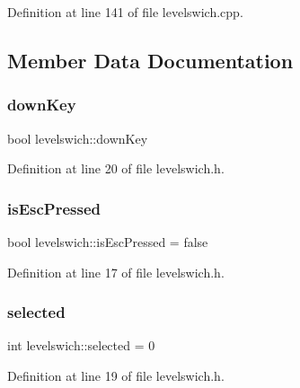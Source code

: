Definition at line 141 of file levelswich.\+cpp.



\subsection{Member Data Documentation}
\hypertarget{classlevelswich_a8823485cfcba6cb615c74610c069c888}{}\label{classlevelswich_a8823485cfcba6cb615c74610c069c888} 
\subsubsection{\texorpdfstring{down\+Key}{downKey}}
{\footnotesize\ttfamily bool levelswich\+::down\+Key}



Definition at line 20 of file levelswich.\+h.

\hypertarget{classlevelswich_ad242526d365bd2ca14c7fe4016b1491c}{}\label{classlevelswich_ad242526d365bd2ca14c7fe4016b1491c} 
\subsubsection{\texorpdfstring{is\+Esc\+Pressed}{isEscPressed}}
{\footnotesize\ttfamily bool levelswich\+::is\+Esc\+Pressed = false}



Definition at line 17 of file levelswich.\+h.

\hypertarget{classlevelswich_a176dacf3b921f80c40ed241650f7687f}{}\label{classlevelswich_a176dacf3b921f80c40ed241650f7687f} 
\subsubsection{\texorpdfstring{selected}{selected}}
{\footnotesize\ttfamily int levelswich\+::selected = 0}



Definition at line 19 of file levelswich.\+h.

\hypertarget{classlevelswich_a6cb148588f510bbae515411e8ca97b26}{}\label{classlevelswich_a6cb148588f510bbae515411e8ca97b26} 

